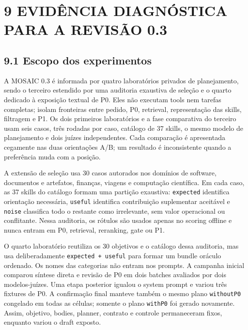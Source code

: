 \documentclass[12pt,a4paper]{article}
\begin{document}

\section*{9 EVIDÊNCIA DIAGNÓSTICA PARA A REVISÃO 0.3}

\subsection*{9.1 Escopo dos experimentos}

A MOSAIC 0.3 é informada por quatro laboratórios privados de planejamento, sendo o terceiro estendido por uma auditoria exaustiva de seleção e o quarto dedicado à exposição textual de P0. Eles não executam tools nem tarefas completas; isolam fronteiras entre pedido, P0, retrieval, representação das skills, filtragem e P1. Os dois primeiros laboratórios e a fase comparativa do terceiro usam seis casos, três rodadas por caso, catálogo de 37 skills, o mesmo modelo de planejamento e dois juízes independentes. Cada comparação é apresentada cegamente nas duas orientações A/B; um resultado é inconsistente quando a preferência muda com a posição.

A extensão de seleção usa 30 casos autorados nos domínios de software, documentos e artefatos, finanças, viagens e computação científica. Em cada caso, as 37 skills do catálogo formam uma partição exaustiva: \texttt{expected} identifica orientação necessária, \texttt{useful} identifica contribuição suplementar aceitável e \texttt{noise} classifica todo o restante como irrelevante, sem valor operacional ou conflitante. Nessa auditoria, os rótulos são usados apenas no scoring offline e nunca entram em P0, retrieval, reranking, gate ou P1.

O quarto laboratório reutiliza os 30 objetivos e o catálogo dessa auditoria, mas usa deliberadamente \texttt{expected + useful} para formar um bundle oráculo ordenado. Os nomes das categorias não entram nos prompts. A campanha inicial comparou síntese direta e revisão de P0 em dois batches avaliados por dois modelos-juízes. Uma etapa posterior igualou o system prompt e variou três fixtures de P0. A confirmação final manteve também o mesmo plano \texttt{withoutP0} congelado em todas as células; somente o plano \texttt{withP0} foi gerado novamente. Assim, objetivo, bodies, planner, contrato e controle permaneceram fixos, enquanto variou o draft exposto.
\end{document}

